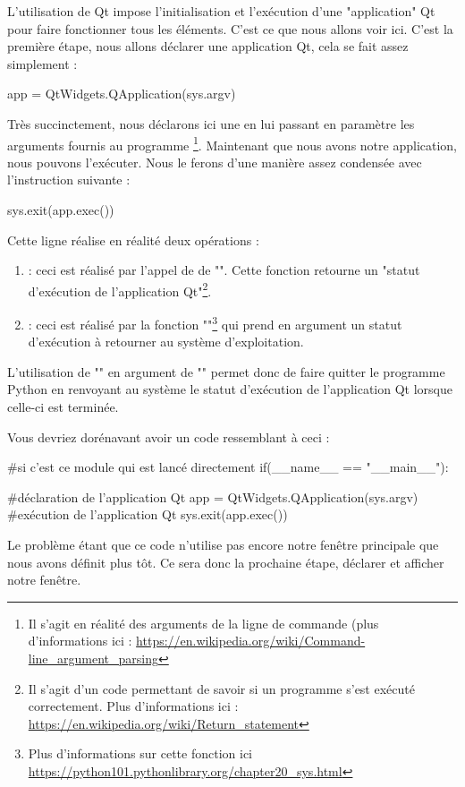 L'utilisation de Qt impose l'initialisation et l'exécution d'une "application" Qt pour faire fonctionner tous les éléments. C'est ce que nous allons voir ici.\newline
C'est la première étape, nous allons déclarer une application Qt, cela se fait assez simplement :
\begin{pyCode}
app = QtWidgets.QApplication(sys.argv)
\end{pyCode}
Très succinctement, nous déclarons ici une  en lui passant en paramètre les arguments fournis au programme
\footnote{Il s'agit en réalité des arguments de la ligne de commande (plus d'informations ici : \url{https://en.wikipedia.org/wiki/Command-line_argument_parsing}}.\newline
Maintenant que nous avons notre application, nous pouvons l'exécuter. Nous le ferons d'une manière assez condensée avec l'instruction suivante :
\begin{pyCode}
sys.exit(app.exec())
\end{pyCode}
Cette ligne réalise en réalité deux opérations :
\begin{enumerate}
    \item {} : ceci est réalisé par l'appel de de "". Cette fonction retourne un "statut d'exécution de l'application Qt"\footnote{Il s'agit d'un code permettant de savoir si un programme s'est exécuté correctement.\newline
    Plus d'informations ici : \url{https://en.wikipedia.org/wiki/Return_statement}}.
    
    \item {} : ceci est réalisé par la fonction ""\footnote{Plus d'informations sur cette fonction ici \url{https://python101.pythonlibrary.org/chapter20_sys.html}} qui prend en argument un statut d'exécution à retourner au système d'exploitation.
\end{enumerate}
L'utilisation de "" en argument de "" permet donc de faire quitter le programme Python en renvoyant au système le statut d'exécution de l'application Qt lorsque celle-ci est terminée.\smallSkip

Vous devriez dorénavant avoir un code ressemblant à ceci :
\begin{pyCode}
#si c'est ce module qui est lancé directement
if(__name__ == "__main__"):

	#déclaration de l'application Qt
	app = QtWidgets.QApplication(sys.argv)
	#exécution de l'application Qt
	sys.exit(app.exec())
\end{pyCode}
Le problème étant que ce code n'utilise pas encore notre fenêtre principale que nous avons définit plus tôt.\newline
Ce sera donc la prochaine étape, déclarer et afficher notre fenêtre.

